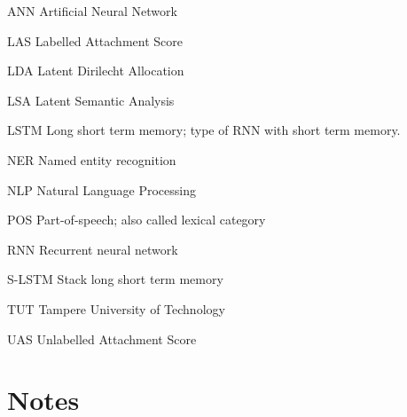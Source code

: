 \documentclass[12pt,a4paper,english
]{tutthesis}
\begin{document}
\begin{termlist}
\item[ANN] Artificial Neural Network
\item[LAS] Labelled Attachment Score
\item[LDA] Latent Dirilecht Allocation
\item[LSA] Latent Semantic Analysis
\item[LSTM] Long short term memory; type of RNN with short term memory.
\item[NER] Named entity recognition
\item[NLP] Natural Language Processing
\item[POS] Part-of-speech; also called lexical category
\item[RNN] Recurrent neural network
\item[S-LSTM] Stack long short term memory
\item[TUT] Tampere University of Technology
\item[UAS] Unlabelled Attachment Score
\end{termlist}


\chapter*{Notes}
\end{document}
